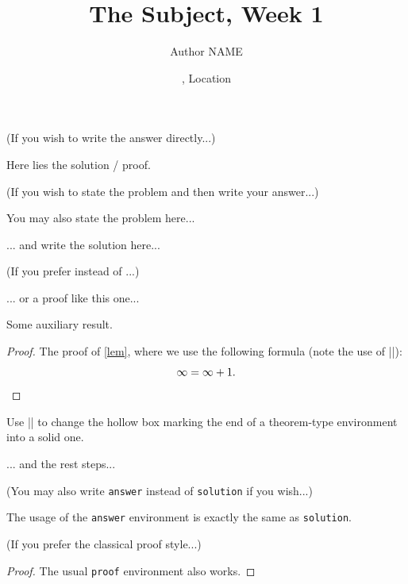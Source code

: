 \documentclass[11pt,
  logo = {example-image},
  title in boldface,
  theorem in new line,
  simple names,
  colored solution,
]{homework}
\title{The Subject, Week 1}
\author{Author NAME}
\date{\TheDate{2026-01-01}, Location}
\begin{document}
\textcolor{gray!55}{(If you wish to write the answer directly...)}

\begin{problem}
    Here lies the solution / proof.
\end{problem}


\bigskip\textcolor{gray!55}{(If you wish to state the problem and then write your answer...)}

\begin{problem}
    You may also state the problem here...
\end{problem}

\begin{solution}
    ... and write the solution here...
\end{solution}

\bigskip\textcolor{gray!55}{(If you prefer  instead of ...)}

\begin{solution}[Proof]
    ... or a proof like this one...
    \begin{lemma}\label{lem}
        Some auxiliary result.
    \end{lemma}
    \begin{proof}
        The proof of \cref{lem}, where we use the following formula (note the use of \cverb|\qedhere|):
        \[
            \infty = \infty + 1.
            \qedhere %
        \]
    \end{proof}
    \begin{fact}
        \proofless
        Use \cverb|\proofless| to change the hollow box marking the end of a theorem-type environment into a solid one.
    \end{fact}
    ... and the rest steps...
\end{solution}


\bigskip\textcolor{gray!55}{(You may also write \texttt{answer} instead of \texttt{solution} if you wish...)}

\begin{answer}
    The usage of the \verb|answer| environment is exactly the same as \verb|solution|.
\end{answer}


\bigskip\textcolor{gray!55}{(If you prefer the classical proof style...)}

\begin{proof}
    The usual \verb|proof| environment also works.
\end{proof}
\end{document}

